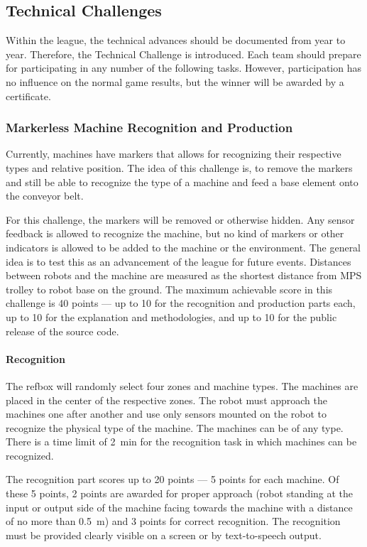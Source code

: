 \documentclass[12pt,twoside]{article}
\begin{document}
\subsection{Technical Challenges}
\label{sec:technical-challenge}
Within the league, the technical advances should be documented from
year to year. Therefore, the Technical Challenge is introduced. Each
team should prepare for participating in any number of the following
tasks. However, participation has no influence on the normal game
results, but the winner will be awarded by a certificate.


\subsubsection{Markerless Machine Recognition and Production}
Currently, machines have markers that allows for recognizing their
respective types and relative position. The idea of this challenge is,
to remove the markers and still be able to recognize the type of a
machine and feed a base element onto the conveyor belt.

For this challenge, the markers will be removed or otherwise
hidden. Any sensor feedback is allowed to recognize the machine, but
no kind of markers or other indicators is allowed to be added to the
machine or the environment. The general idea is to test this as an
advancement of the league for future events. Distances between robots
and the machine are measured as the shortest distance from MPS trolley
to robot base on the ground. The maximum achievable score in this
challenge is 40 points --- up to 10 for the recognition and production
parts each, up to 10 for the explanation and methodologies, and up to
10 for the public release of the source code.

\vspace{-2ex}\paragraph{Recognition}
The refbox will randomly select four zones and machine types. The
machines are placed in the center of the respective zones. The robot
must approach the machines one after another and use only sensors
mounted on the robot to recognize the physical type of the
machine. The machines can be of any type. There is a time limit of
\SI{2}{\minute} for the recognition task in which machines can be recognized.

The recognition part scores up to 20 points --- 5 points for each
machine. Of these 5 points, 2 points are awarded for proper approach
(robot standing at the input or output side of the machine facing
towards the machine with a distance of no more than \SI{0.5}{\metre})
and 3 points for correct recognition. The recognition must be provided
clearly visible on a screen or by text-to-speech output.
\end{document}

